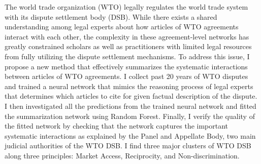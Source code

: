 The world trade organization (WTO) legally regulates the world trade system with its dispute settlement body (DSB).
While there exists a shared understanding among legal experts about how articles of WTO agreements interact with each other,
the complexity in these agreement-level networks has greatly constrained scholars as well as practitioners with limited legal resources from fully utilizing the dispute settlement mechanisms. 
To address this issue, I propose a new method that effectively summarizes the systematic interactions between articles of WTO agreements.
I collect past 20 years of WTO disputes and trained a neural network that mimics the reasoning process of legal experts that determines which articles to cite for given factual description of the dispute.
I then investigated all the predictions from the trained neural network and fitted the summarization network using Random Forest.
Finally, I verify the quality of the fitted network by checking that the network captures the important systematic interactions as explained by the Panel and Appellate Body, two main judicial authorities of the WTO DSB.  %
I find three major clusters of WTO DSB along three principles: Market Access, Reciprocity, and Non-discrimination.


